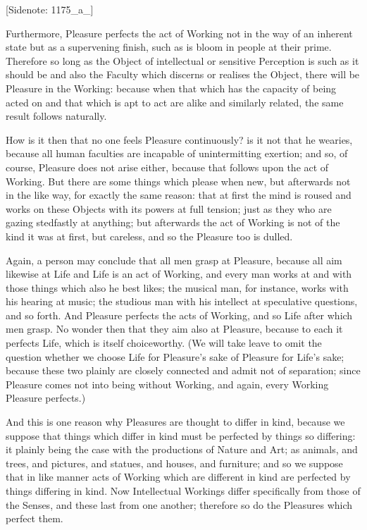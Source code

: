 [Sidenote: 1175_a_]

Furthermore, Pleasure perfects the act of Working not in the way of an
inherent state but as a supervening finish, such as is bloom in people
at their prime. Therefore so long as the Object of intellectual or
sensitive Perception is such as it should be and also the Faculty which
discerns or realises the Object, there will be Pleasure in the Working:
because when that which has the capacity of being acted on and that
which is apt to act are alike and similarly related, the same result
follows naturally.

How is it then that no one feels Pleasure continuously? is it not that
he wearies, because all human faculties are incapable of unintermitting
exertion; and so, of course, Pleasure does not arise either, because
that follows upon the act of Working. But there are some things which
please when new, but afterwards not in the like way, for exactly the
same reason: that at first the mind is roused and works on these Objects
with its powers at full tension; just as they who are gazing stedfastly
at anything; but afterwards the act of Working is not of the kind it was
at first, but careless, and so the Pleasure too is dulled.

Again, a person may conclude that all men grasp at Pleasure, because all
aim likewise at Life and Life is an act of Working, and every man works
at and with those things which also he best likes; the musical man, for
instance, works with his hearing at music; the studious man with his
intellect at speculative questions, and so forth. And Pleasure perfects
the acts of Working, and so Life after which men grasp. No wonder then
that they aim also at Pleasure, because to each it perfects Life, which
is itself choiceworthy. (We will take leave to omit the question whether
we choose Life for Pleasure's sake of Pleasure for Life's sake; because
these two plainly are closely connected and admit not of separation;
since Pleasure comes not into being without Working, and again, every
Working Pleasure perfects.)

And this is one reason why Pleasures are thought to differ in kind,
because we suppose that things which differ in kind must be perfected by
things so differing: it plainly being the case with the productions of
Nature and Art; as animals, and trees, and pictures, and statues, and
houses, and furniture; and so we suppose that in like manner acts of
Working which are different in kind are perfected by things differing in
kind. Now Intellectual Workings differ specifically from those of the
Senses, and these last from one another; therefore so do the Pleasures
which perfect them.

